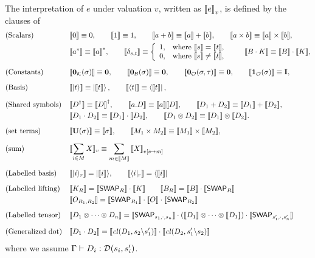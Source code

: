 \begin{definition}
The interpretation of $e$ under valuation $v$, written as $\sem{e}_v$, is defined by the clauses of 
{\allowdisplaybreaks
 \begin{align*}
    & \text{(Scalars)} && 
 \sem{0} \equiv 0, 
 \qquad 
 \sem{1} \equiv 1,
 \qquad
 \sem{a + b} \equiv \sem{a} + \sem{b},
 \qquad
 \sem{a \times b} \equiv \sem{a} \times \sem{b}, 
    \\ & &&
 \sem{a^*} \equiv \sem{a}^*,
 \qquad
 \sem{\delta_{s, t}} \equiv \left\{
 \begin{array}{ll}
        1, & \text{where } \sem{s} = \sem{t}, \\
        0, & \text{where } \sem{s} \neq \sem{t}, 
 \end{array}
 \right.
 \qquad
 \sem{B \cdot K} \equiv \sem{B} \cdot \sem{K},
  \\[0.2cm]
    & \text{(Constants)} &&
 \sem{\mathbf{0}_\mathcal{K}(\sigma)} \equiv \mathbf{0}, 
 \qquad
 \sem{\mathbf{0}_\mathcal{B}(\sigma)} \equiv \mathbf{0},
 \qquad
 \sem{\mathbf{0}_\mathcal{O}(\sigma, \tau)} \equiv \mathbf{0}, 
 \qquad
 \sem{\mathbf{1}_\mathcal{O}(\sigma)} \equiv \mathbf{I},
  \\[0.2cm]
    & \text{(Basis)} &&
 \sem{\ket{t}} \equiv \ket{\sem{t}},
 \qquad
 \sem{\bra{t}} \equiv \bra{\sem{t}},
  \\[0.2cm]
    & \text{(Shared symbols)} &&
 \sem{D^\dagger} \equiv \sem{D}^\dagger,
 \qquad
 \sem{a.D} \equiv \sem{a} \sem{D},
 \qquad
 \sem{D_1 + D_2} \equiv \sem{D_1}+\sem{D_2}, \\
    & &&
 \sem{D_1 \cdot D_2} \equiv \sem{D_1} \cdot \sem{D_2},
 \qquad
 \sem{D_1 \otimes D_2} \equiv \sem{D_1} \otimes \sem{D_2}. \\[0.2cm]
       & \text{(set terms)} && 
    \sem{\mathbf{U}(\sigma)} \equiv \sem{\sigma},
    \qquad
    \sem{M_1 \times M_2} \equiv \sem{M_1} \times \sem{M_2},
    \\[0.2cm]
       & \text{(sum)} &&
    \llbracket \sum_{i \in M} X \rrbracket_v \equiv \sum_{m \in \sem{M}} \sem{X}_{v[i\mapsto m]} \\[0.2cm]
    & \text{(Labelled basis)} &&
      \sem{|i\>_r} = |\sem{i}\>,\qquad \sem{\<i|_r} = \<\sem{i}| \\[0.2cm]
    & \text{(Labelled lifting)} &&
    \sem{K_R} = \sem{\Swap_R} \cdot \sem{K}
 \qquad
 \sem{B_R} = \sem{B}\cdot \sem{\Swap_R} \\
 & && \sem{O_{R_1,R_2}} = \sem{\Swap_{R_1}}\cdot \sem{O}\cdot \sem{\Swap_{R_2}} \\[0.2cm]
 & \text{(Labelled tensor)} &&
 \sem{D_1\otimes \cdots \otimes D_n} = \sem{\Swap_{s_1,\cdot,s_n}}\cdot (\sem{D_1}\otimes \cdots \otimes \sem{D_1})\cdot \sem{\Swap_{s'_1,\cdot,s'_n}} \\[0.2cm]
 & \text{(Generalized dot)} &&
  \sem{D_1\cdot D_2} = \sem{\cl(D_1, s_2\backslash s'_1)}\cdot \sem{\cl(D_2, s'_1\backslash s_2)}
\end{align*}
}
where we assume $\Gamma\vdash D_i : \cD(s_i,s'_i)$.
\end{definition}
